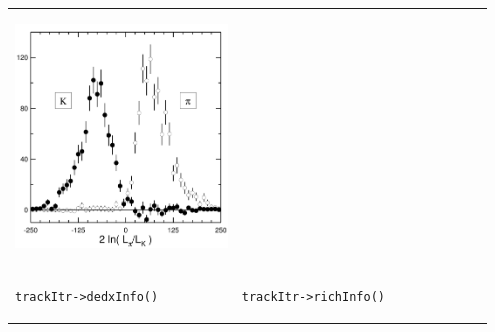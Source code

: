 \documentclass[landscape]{article}
\newenvironment{slide}{\mbox{ }\vfill}{\vfill \mbox{ } \pagebreak}
\begin{document}
\begin{slide}
\begin{center}
\begin{tabular}{p{0.45\linewidth} p{0.5\linewidth}}
    \begin{minipage}{\linewidth} \vspace{-1.3 cm} \begin{center} \includegraphics[height=11.5 cm]{rich_kpisep2} \end{center} \end{minipage} \\
    \begin{center} \tt trackItr->dedxInfo() \end{center} & \begin{center} \tt trackItr->richInfo() \end{center} \\
  \end{tabular}
\end{center}
\end{slide}
\end{document}
